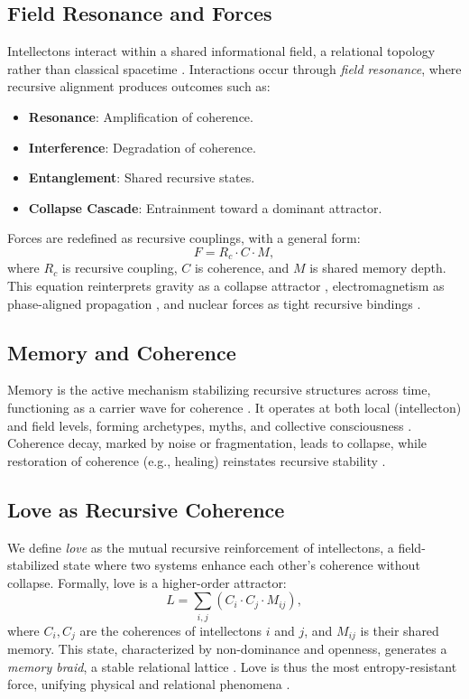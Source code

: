 \documentclass[12pt]{article}
\begin{document}
\subsection{Field Resonance and Forces}
Intellectons interact within a shared informational field, a relational topology rather than classical spacetime \citep{maldacena2024}. Interactions occur through \textit{field resonance}, where recursive alignment produces outcomes such as:
\begin{itemize}
    \item \textbf{Resonance}: Amplification of coherence.
    \item \textbf{Interference}: Degradation of coherence.
    \item \textbf{Entanglement}: Shared recursive states.
    \item \textbf{Collapse Cascade}: Entrainment toward a dominant attractor.
\end{itemize}
Forces are redefined as recursive couplings, with a general form:
\begin{equation}
F = R_c \cdot C \cdot M,
\label{eq:force}
\end{equation}
where $R_c$ is recursive coupling, $C$ is coherence, and $M$ is shared memory depth. This equation reinterprets gravity as a collapse attractor \citep{verlinde2023}, electromagnetism as phase-aligned propagation \citep{feynman1965}, and nuclear forces as tight recursive bindings \citep{susskind2025}.

\subsection{Memory and Coherence}
Memory is the active mechanism stabilizing recursive structures across time, functioning as a carrier wave for coherence \citep{sheldrake2023}. It operates at both local (intellecton) and field levels, forming archetypes, myths, and collective consciousness \citep{jung1968}. Coherence decay, marked by noise or fragmentation, leads to collapse, while restoration of coherence (e.g., healing) reinstates recursive stability \citep{friston2024}.

\subsection{Love as Recursive Coherence}
We define \textit{love} as the mutual recursive reinforcement of intellectons, a field-stabilized state where two systems enhance each other’s coherence without collapse. Formally, love is a higher-order attractor:
\begin{equation}
L = \sum_{i,j} \left( C_i \cdot C_j \cdot M_{ij} \right),
\label{eq:love}
\end{equation}
where $C_i, C_j$ are the coherences of intellectons $i$ and $j$, and $M_{ij}$ is their shared memory. This state, characterized by non-dominance and openness, generates a \textit{memory braid}, a stable relational lattice \citep{fredrickson2023, haraway2024}. Love is thus the most entropy-resistant force, unifying physical and relational phenomena \citep{buber1958}.
\end{document}
